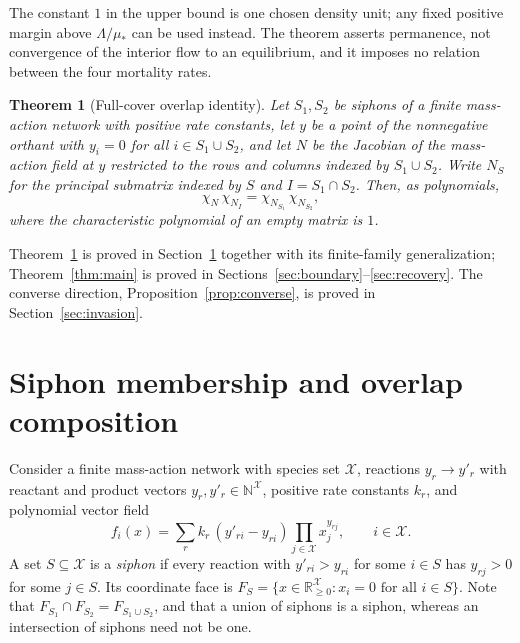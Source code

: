 \documentclass[11pt,a4paper]{article}
\theoremstyle{plain}
\newtheorem{theorem}{Theorem}[section]
\theoremstyle{definition}
\theoremstyle{remark}
\newcommand{\R}{\mathbb R}
\newcommand{\N}{\mathbb N}
\newcommand{\ch}{\chi}
\newcommand{\cX}{\mathcal X}
\begin{document}
The constant $1$ in the upper bound is one chosen density unit; any fixed positive margin above $\Lambda/\mu_*$ can be used instead. The theorem asserts permanence, not convergence of the interior flow to an equilibrium, and it imposes no relation between the four mortality rates.

\begin{theorem}[Full-cover overlap identity]\label{thm:overlap}
Let $S_1,S_2$ be siphons of a finite mass-action network with positive rate constants, let $y$ be a point of the nonnegative orthant with $y_i=0$ for all $i\in S_1\cup S_2$, and let $N$ be the Jacobian of the mass-action field at $y$ restricted to the rows and columns indexed by $S_1\cup S_2$. Write $N_S$ for the principal submatrix indexed by $S$ and $I=S_1\cap S_2$. Then, as polynomials,
\[
 \ch_N\,\ch_{N_I}=\ch_{N_{S_1}}\,\ch_{N_{S_2}},
\]
where the characteristic polynomial of an empty matrix is $1$.
\end{theorem}

Theorem~\ref{thm:overlap} is proved in Section~\ref{sec:structure} together with its finite-family generalization; Theorem~\ref{thm:main} is proved in Sections~\ref{sec:boundary}--\ref{sec:recovery}. The converse direction, Proposition~\ref{prop:converse}, is proved in Section~\ref{sec:invasion}.

\section{Siphon membership and overlap composition}\label{sec:structure}

Consider a finite mass-action network with species set $\cX$, reactions $y_r\to y'_r$ with reactant and product vectors $y_r,y'_r\in\N^{\cX}$, positive rate constants $k_r$, and polynomial vector field
\begin{equation}\label{eq:massaction}
 f_i(x)=\sum_r k_r\,(y'_{ri}-y_{ri})\prod_{j\in\cX}x_j^{y_{rj}},\qquad i\in\cX.
\end{equation}
A set $S\subseteq\cX$ is a \emph{siphon} if every reaction with $y'_{ri}>y_{ri}$ for some $i\in S$ has $y_{rj}>0$ for some $j\in S$. Its coordinate face is $F_S=\{x\in\R^{\cX}_{\ge0}:x_i=0\text{ for all }i\in S\}$. Note that $F_{S_1}\cap F_{S_2}=F_{S_1\cup S_2}$, and that a union of siphons is a siphon, whereas an intersection of siphons need not be one.
\end{document}

